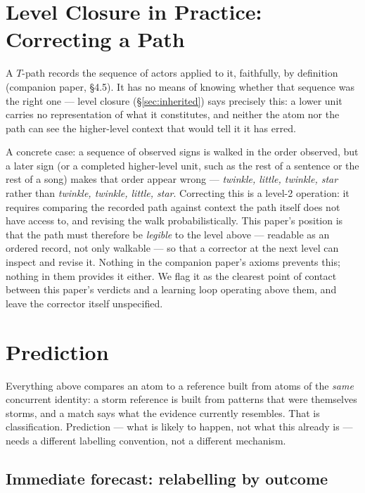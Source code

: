 \documentclass[12pt, a4paper]{article}
\begin{document}
\section{Level Closure in Practice: Correcting a Path}
\label{sec:level_closure_practice}

A $T$-path records the sequence of actors applied to it, faithfully,
by definition (companion paper, \S4.5). It has no means of knowing
whether that sequence was the right one --- level closure
(\S\ref{sec:inherited}) says precisely this: a lower unit carries no
representation of what it constitutes, and neither the atom nor the
path can see the higher-level context that would tell it it has erred.

A concrete case: a sequence of observed signs is walked in the order
observed, but a later sign (or a completed higher-level unit, such as
the rest of a sentence or the rest of a song) makes that order appear
wrong --- \emph{twinkle, little, twinkle, star} rather than
\emph{twinkle, twinkle, little, star}. Correcting this is a level-2
operation: it requires comparing the recorded path against context the
path itself does not have access to, and revising the walk
probabilistically. This paper's position is that the path must
therefore be \emph{legible} to the level above --- readable as an
ordered record, not only walkable --- so that a corrector at the next
level can inspect and revise it. Nothing in the companion paper's
axioms prevents this; nothing in them provides it either. We flag it
as the clearest point of contact between this paper's verdicts and a
learning loop operating above them, and leave the corrector itself
unspecified.

\section{Prediction}
\label{sec:prediction}

Everything above compares an atom to a reference built from atoms of
the \emph{same} concurrent identity: a $\mathrm{storm}$ reference is
built from patterns that were themselves storms, and a match says what
the evidence currently resembles. That is classification. Prediction
--- what is likely to happen, not what this already is --- needs a
different labelling convention, not a different mechanism.

\subsection{Immediate forecast: relabelling by outcome}
\label{subsec:immediate_forecast}
\end{document}
